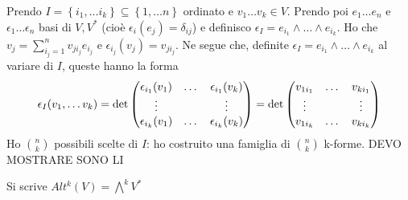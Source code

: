 Prendo $I=\left\{ i_1,\dots i_k \right\}\subseteq 
\left\{ 1,\dots n \right\}$ ordinato e $v_1\dots v_k\in V$.
Prendo poi $e_1\dots e_n$ e $\epsilon_1\dots\epsilon_n$ basi
di $V,V^*$ (cioè $\epsilon_i(e_j)=\delta_{ij}$) e definisco
$\epsilon_I=e_{i_1}\wedge\dots\wedge e_{i_k}$. Ho che 
$v_j=\sum_{i_j=1}^n v_{j i_j}e_{i_j}$ e 
$\epsilon_{i_j}(v_j)=v_{j i_j}$. Ne segue che, definite
$\epsilon_I=e_{i_1}\wedge\dots\wedge e_{i_k}$ al variare di $I$,
queste hanno la forma
\begin{displaymath}
    \epsilon_I(v_1,\dots v_k)= 
    \det\mqty
    (\epsilon_{i_1}(v_1)  & \dots & \epsilon_{i_1}(v_k) \\
    \vdots                &       & \vdots              \\
    \epsilon_{i_k}(v_1)  & \dots & \epsilon_{i_k}(v_k)  )=
    \det\mqty
    (v_{1i_1}  & \dots & v_{ki_1} \\
    \vdots     &       & \vdots   \\
    v_{1i_k}   & \dots & v_{ki_k} )
\end{displaymath}
Ho $\binom{n}{k}$ possibili scelte di $I$: ho costruito una
famiglia di $\binom{n}{k}$ k-forme. DEVO MOSTRARE SONO LI



Si scrive $Alt^k(V)=\bigwedge^kV^*$

